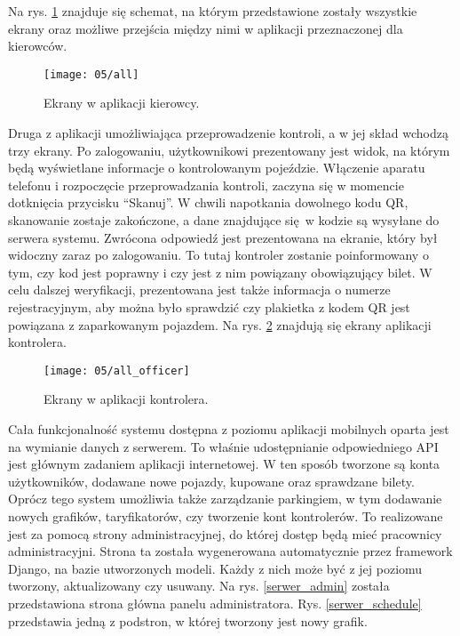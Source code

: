 Na rys. \ref{przejscia_kierowca} znajduje się schemat, na którym przedstawione zostały wszystkie ekrany oraz możliwe przejścia między nimi w aplikacji przeznaczonej dla kierowców.

\newpage

\begin{figure}[h!]
	\begin{center}
		\texttt{[image: 05/all]}
	\end{center}
	\caption{Ekrany w aplikacji kierowcy.}
	\label{przejscia_kierowca}
\end{figure}

\newpage

Druga z aplikacji umożliwiająca przeprowadzenie kontroli, a w jej skład wchodzą trzy ekrany. Po zalogowaniu, użytkownikowi prezentowany jest widok, na którym będą wyświetlane informacje o kontrolowanym pojeździe. Włączenie aparatu telefonu i rozpoczęcie przeprowadzania kontroli, zaczyna się w momencie dotknięcia przycisku ``Skanuj''. W chwili napotkania dowolnego kodu QR, skanowanie zostaje zakończone, a dane znajdujące się w kodzie są wysyłane do serwera systemu. Zwrócona odpowiedź jest prezentowana na ekranie, który był widoczny zaraz po zalogowaniu. To tutaj kontroler zostanie poinformowany o tym, czy kod jest poprawny i czy jest z nim powiązany obowiązujący bilet. W celu dalszej weryfikacji, prezentowana jest także informacja o numerze rejestracyjnym, aby można było sprawdzić czy plakietka z kodem QR jest powiązana z zaparkowanym pojazdem. Na rys. \ref{przejscia_kontroler} znajdują się ekrany aplikacji kontrolera.

\begin{figure}[h!]
	\begin{center}
		\texttt{[image: 05/all\_officer]}
	\end{center}
	\caption{Ekrany w aplikacji kontrolera.}
	\label{przejscia_kontroler}
\end{figure}

Cała funkcjonalność systemu dostępna z poziomu aplikacji mobilnych oparta jest na wymianie danych z serwerem. To właśnie udostępnianie odpowiedniego API jest głównym zadaniem aplikacji internetowej. W ten sposób tworzone są konta użytkowników, dodawane nowe pojazdy, kupowane oraz sprawdzane bilety. Oprócz tego system umożliwia także zarządzanie parkingiem, w tym dodawanie nowych grafików, taryfikatorów, czy tworzenie kont kontrolerów. To realizowane jest za pomocą strony administracyjnej, do której dostęp będą mieć pracownicy administracyjni. Strona ta została wygenerowana automatycznie przez framework Django, na bazie utworzonych modeli. Każdy z nich może być z jej poziomu tworzony, aktualizowany czy usuwany. Na rys. \ref{serwer_admin} została przedstawiona strona główna panelu administratora. Rys. \ref{serwer_schedule} przedstawia jedną z podstron, w której tworzony jest nowy grafik.

